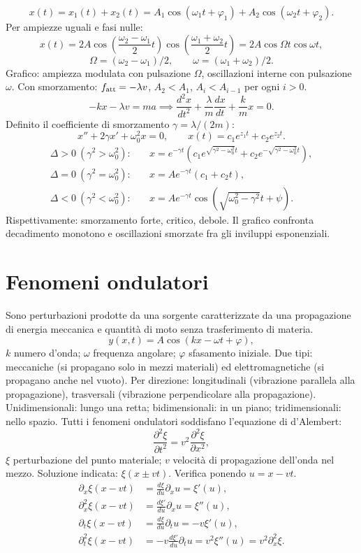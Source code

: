 \documentclass[11pt,a4paper]{article}
\newcommand{\pagina}[1]{\clearpage}
\begin{document}
\[x(t)=x_1(t)+x_2(t)=A_1\cos(\omega_1t+\varphi_1)+A_2\cos(\omega_2t+\varphi_2).\]
Per ampiezze uguali e fasi nulle:
\[x(t)=2A\cos\left(\frac{\omega_2-\omega_1}{2}t\right)\cos\left(\frac{\omega_1+\omega_2}{2}t\right)=2A\cos\Omega t\cos\omega t,\]
\[\Omega=(\omega_2-\omega_1)/2,\qquad\omega=(\omega_1+\omega_2)/2.\]
Grafico: ampiezza modulata con pulsazione $\Omega$, oscillazioni interne con pulsazione $\omega$.
Con smorzamento: $f_{\rm att}=-\lambda v$, $A_2<A_1$, $A_i<A_{i-1}$ per ogni $i>0$.
\[-kx-\lambda v=ma\implies\frac{d^2x}{dt^2}+\frac\lambda m\frac{dx}{dt}+\frac kmx=0.\]
Definito il coefficiente di smorzamento $\gamma=\lambda/(2m)$:
\[x''+2\gamma x'+\omega_0^2x=0,\qquad x(t)=c_1e^{z_1t}+c_2e^{z_2t}.\]
\begin{align*}
\Delta>0\ (\gamma^2>\omega_0^2):&\quad x=e^{-\gamma t}\left(c_1e^{\sqrt{\gamma^2-\omega_0^2}t}+c_2e^{-\sqrt{\gamma^2-\omega_0^2}t}\right),\\
\Delta=0\ (\gamma^2=\omega_0^2):&\quad x=Ae^{-\gamma t}(c_1+c_2t),\\
\Delta<0\ (\gamma^2<\omega_0^2):&\quad x=Ae^{-\gamma t}\cos\left(\sqrt{\omega_0^2-\gamma^2}t+\psi\right).
\end{align*}
Rispettivamente: smorzamento forte, critico, debole. Il grafico confronta decadimento monotono e oscillazioni smorzate fra gli inviluppi esponenziali.
\pagina{7}\section*{Fenomeni ondulatori}
Sono perturbazioni prodotte da una sorgente caratterizzate da una propagazione di energia meccanica e quantità di moto senza trasferimento di materia.
\[y(x,t)=A\cos(kx-\omega t+\varphi),\]
$k$ numero d'onda; $\omega$ frequenza angolare; $\varphi$ sfasamento iniziale.
Due tipi: meccaniche (si propagano solo in mezzi materiali) ed elettromagnetiche (si propagano anche nel vuoto).
Per direzione: longitudinali (vibrazione parallela alla propagazione), trasversali (vibrazione perpendicolare alla propagazione).
Unidimensionali: lungo una retta; bidimensionali: in un piano; tridimensionali: nello spazio.
Tutti i fenomeni ondulatori soddisfano l'equazione di d'Alembert:
\[\frac{\partial^2\xi}{\partial t^2}=v^2\frac{\partial^2\xi}{\partial x^2},\]
$\xi$ perturbazione del punto materiale; $v$ velocità di propagazione dell'onda nel mezzo. Soluzione indicata: $\xi(x\pm vt)$. Verifica ponendo $u=x-vt$.
\pagina{8}
\begin{align*}
\partial_x\xi(x-vt)&=\frac{d\xi}{du}\partial_xu=\xi'(u),\\
\partial_x^2\xi(x-vt)&=\frac{d\xi'}{du}\partial_xu=\xi''(u),\\
\partial_t\xi(x-vt)&=\frac{d\xi}{du}\partial_tu=-v\xi'(u),\\
\partial_t^2\xi(x-vt)&=-v\frac{d\xi'}{du}\partial_tu=v^2\xi''(u)=v^2\partial_x^2\xi.
\end{align*}
\end{document}
